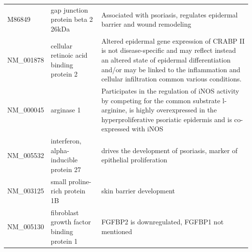 \documentclass[10pt,a4paper]{article}
\begin{document}
\begin{table}[]
\begin{tabular}{l|p{4.5cm} p{8.5cm}}
		M86849             & gap junction protein beta 2 26kDa                                                                                       & Associated with psoriasis, regulates epidermal barrier and wound remodeling\cite{sun2010association, djalilian2006connexin}                                                                                                                                                               \\
		NM\_001878         & cellular retinoic acid binding protein 2                                                                                & Altered epidermal gene expression of CRABP II is not disease-specific and may reflect instead an altered state of epidermal differentiation and/or may be linked to the inflammation and cellular infiltration common various conditions.\cite{algermissen1996differential} \\
		NM\_000045         & arginase 1                                                                                                              & Participates in the regulation of iNOS activity by competing for the common substrate l-arginine, is highly overexpressed in the hyperproliferative psoriatic epidermis and is co-expressed with iNOS\cite{bruch2003arginase}                                     \\
		NM\_005532         & interferon, alpha-inducible protein 27                                                                                  & drives the development of psoriasis, marker of epithelial proliferation\cite{nestle2005plasmacytoid, suomela2004interferon}                                                                                                                                                                     \\
		NM\_003125         & small proline-rich protein 1B                                                                                           & skin barrier development\cite{bergboer2012genetics}                                                                                                                                                                                                                    \\
		NM\_005130         & fibroblast growth factor binding protein 1                                                                              & FGFBP2 is downregulated, FGFBP1 not mentioned\cite{suarez2012expanding}                                                                                                                                                                                               \\

\end{tabular}
\end{table}
\end{document}
